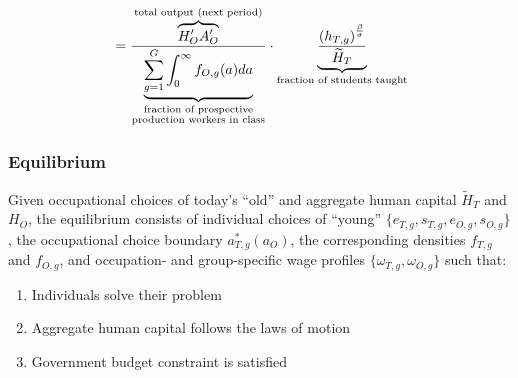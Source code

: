 \documentclass[11pt]{beamer}
\begin{document}
\begin{frame}
\begin{itemize}
\begin{align*}
					& =\frac{\overbrace{{H}'_O {A}'_O}^{\textrm{total output (next period)}}}{\underbrace{\sum_{g=1}^G \int_0^\infty f_{O,g}(a) da}_{\begin{subarray}{c}\textrm{fraction of prospective} \\ 
								\textrm{production workers in class}\end{subarray}}} \cdot \underbrace{\frac{\left( h_{T,g} \right)^{\frac{\beta}{\sigma}}}{{\widetilde{H}_T}}}_{\textrm{fraction of students taught}}\\ 
				\end{align*}
			\end{itemize}
			
		\end{frame}
		
		\begin{frame}
			\frametitle{Equilibrium}
			\label{eqm}
			\footnotesize
			Given occupational choices of today's ``old'' and aggregate human capital $\widetilde{H}_{T}$ and ${H}_{O}$, the equilibrium consists of individual choices of ``young'' $\{e_{T,g}, s_{T,g}, e_{O,g}, s_{O,g}\}$, the occupational choice boundary $a^*_{T,g}(a_O)$, the corresponding densities $f_{T,g}$ and $f_{O,g}$, and occupation- and group-specific wage profiles $\{\omega_{T,g}, \omega_{O,g}\}$ such that:
			\begin{enumerate}
				\item Individuals solve their problem \hyperlink{time_inv}{} \hyperlink{good_inv}{}
				\item Aggregate human capital follows the laws of motion \hyperlink{laws}{}
				\item Government budget constraint is satisfied
			\end{enumerate}
			\hyperlink{param}{}
		\end{frame}
		
\end{document}

